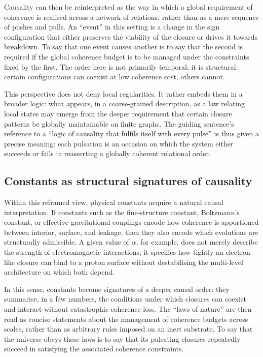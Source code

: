 \documentclass[11pt,a4paper]{article}
\theoremstyle{definition}
\begin{document}
Causality can then be reinterpreted as the way in which a global requirement of coherence is realised across a network of relations, rather than as a mere sequence of pushes and pulls. An ``event'' in this setting is a change in the sign configuration that either preserves the viability of the closure or drives it towards breakdown.\cite{Laubscher_Leakage_Probability_2024,Laubscher_EffectiveFields_2024} To say that one event causes another is to say that the second is required if the global coherence budget is to be managed under the constraints fixed by the first. The order here is not primarily temporal; it is structural: certain configurations can coexist at low coherence cost, others cannot.\cite{Laubscher_Existence_PulsatingClosure_2026}

This perspective does not deny local regularities. It rather embeds them in a broader logic: what appears, in a coarse-grained description, as a law relating local states may emerge from the deeper requirement that certain closure patterns be globally maintainable on finite graphs.\cite{Laubscher_PDL_GlobalMapping_v6_2024} The guiding sentence’s reference to a ``logic of causality that fulfils itself with every pulse'' is thus given a precise meaning: each pulsation is an occasion on which the system either succeeds or fails in reasserting a globally coherent relational order.

\subsection{Constants as structural signatures of causality}

Within this reframed view, physical constants acquire a natural causal interpretation. If constants such as the fine-structure constant, Boltzmann’s constant, or effective gravitational couplings encode how coherence is apportioned between interior, surface, and leakage, then they also encode which evolutions are structurally admissible.\cite{Laubscher_Alpha_v2_2024,Laubscher_UniversalCoherenceLeakage_2024,Laubscher_PDL_Position_2024} A given value of \(\alpha\), for example, does not merely describe the strength of electromagnetic interactions; it specifies how tightly an electron-like closure can bind to a proton surface without destabilising the multi-level architecture on which both depend.\cite{Laubscher_Alpha_v2_2024,Laubscher_Born_Golden_v2_2024}

In this sense, constants become signatures of a deeper causal order: they summarise, in a few numbers, the conditions under which closures can coexist and interact without catastrophic coherence loss. The ``laws of nature'' are then read as concise statements about the management of coherence budgets across scales, rather than as arbitrary rules imposed on an inert substrate.\cite{Laubscher_PDL_GlobalMapping_v6_2024} To say that the universe obeys these laws is to say that its pulsating closures repeatedly succeed in satisfying the associated coherence constraints.
\end{document}
